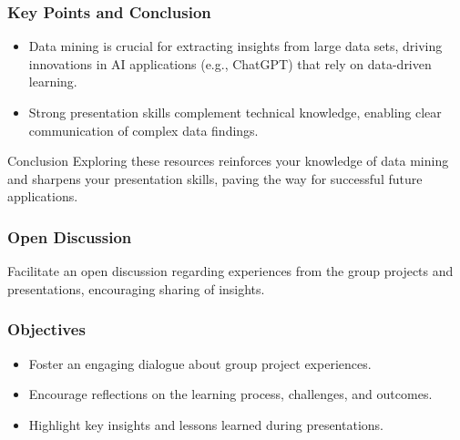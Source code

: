 \documentclass[aspectratio=169]{beamer}
\begin{document}
\begin{frame}[fragile]
    \frametitle{Key Points and Conclusion}
    \begin{itemize}
        \item Data mining is crucial for extracting insights from large data sets, driving innovations in AI applications (e.g., ChatGPT) that rely on data-driven learning.
        \item Strong presentation skills complement technical knowledge, enabling clear communication of complex data findings.
    \end{itemize}
    \begin{block}{Conclusion}
        Exploring these resources reinforces your knowledge of data mining and sharpens your presentation skills, paving the way for successful future applications.
    \end{block}
\end{frame}

\begin{frame}[fragile]
    \frametitle{Open Discussion}
    Facilitate an open discussion regarding experiences from the group projects and presentations, encouraging sharing of insights.
\end{frame}

\begin{frame}[fragile]
    \frametitle{Objectives}
    \begin{itemize}
        \item Foster an engaging dialogue about group project experiences.
        \item Encourage reflections on the learning process, challenges, and outcomes.
        \item Highlight key insights and lessons learned during presentations.
    \end{itemize}
\end{frame}
\end{document}
